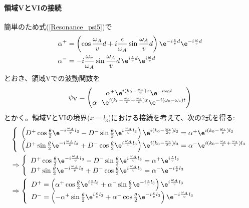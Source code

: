 \paragraph{領域VとVIの接続}簡単のため式(\ref{Resonance_psi5})で
\begin{align}
\alpha^+ &= \left(\cos \frac{\omega_A}{v}d +i\frac{\epsilon}{\omega_A} \sin \frac{\omega_A}{v}d\right) \e^{-i\frac{\epsilon}{v} d} \e^{-i\frac{\omega}{v} d} \label{Resonance_alpha+}\\
\alpha^-&=-i \frac{\omega_r}{\omega_A} \sin \frac{\omega_A}{v}d  \, \e^{i\frac{\epsilon}{v}d} \e^{i\frac{\omega}{v} d} \label{Resonance_alpha-}
\end{align}
とおき、領域Vでの波動関数を
\begin{equation}
\psi_\mathrm{V} =\begin{pmatrix} \alpha^+ \e^{i(k_0-\frac{\omega_z}{v})x}\e^{-i\omega_0t}\\ \alpha^- \e^{i(k_0-\frac{\omega_s}{v}+\frac{\omega_z}{v})x}\e^{-i(\omega_0-\omega_s)t} \end{pmatrix}
\end{equation}
とかく。領域VとVIの境界($x=l_3$)における接続を考えて、次の2式を得る:
\begin{align}
&\left\{\begin{array}{l} \left(D^+ \cos\frac{\theta}{2} \e^{-i\frac{\omega_A}{v} l_3}-D^-\sin\frac{\theta}{2} \e^{i\frac{\omega_A}{v}l_3}\right) \e^{i(k_0-\frac{\omega_s}{2v})l_3} =\alpha^+ \e^{i(k_0-\frac{\omega_z}{v})l_3} \\ \left(D^+\sin\frac{\theta}{2}\e^{-i\frac{\omega_A}{v} l_3}+D^-\cos\frac{\theta}{2}\e^{i\frac{\omega_A}{v} l_3}\right) \e^{i(k_0-\frac{\omega_s}{2v})l_3} =\alpha^- \e^{i(k_0-\frac{\omega_s}{v}+\frac{\omega_z}{v})l_3}\end{array} \right. \notag \\
&\Rightarrow \left\{\begin{array}{l} D^+ \cos\frac{\theta}{2} \e^{-i\frac{\omega_A}{v} l_3}-D^-\sin\frac{\theta}{2} \e^{i\frac{\omega_A}{v}l_3} =\alpha^+ \e^{i\frac{\epsilon}{v}l_3} \\ D^+\sin\frac{\theta}{2}\e^{-i\frac{\omega_A}{v} l_3}+D^-\cos\frac{\theta}{2}\e^{i\frac{\omega_A}{v} l_3} =\alpha^- \e^{-i\frac{\epsilon}{v}l_3}\end{array} \right. \notag \\
&\Rightarrow \left\{\begin{array}{l} D^+ =\left(\alpha^+ \cos\frac{\theta}{2}\e^{i\frac{\epsilon}{v}l_3} +\alpha^- \sin\frac{\theta}{2}\e^{-i\frac{\epsilon}{v}l_3}\right) \e^{i\frac{\omega_A}{v} l_3} \\ D^-=\left(-\alpha^+ \sin\frac{\theta}{2} \e^{i\frac{\epsilon}{v}l_3} +\alpha^-\cos\frac{\theta}{2}\e^{-i\frac{\epsilon}{v}l_3} \right)\e^{-i\frac{\omega_A}{v} l_3} \end{array} \right.
\end{align}
